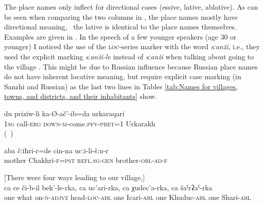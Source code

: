 The place names only inflect for directional cases (essive, lative, ablative). As can be seen when comparing the two columns in , the place names mostly have directional meaning, \tie\ the lative is identical to the place names themselves. Examples are given in . In the speech of a few younger speakers (age 30 or younger) I noticed the use of the  \textsc{loc}-series marker with the word \textit{sːanži}, i.e., they used the explicit marking \textit{sːanži-le} instead of \textit{sːanži} when talking about going to the village . This might be due to Russian influence because Russian place names do not have inherent locative meaning, but require explicit case marking (in Sanzhi and Russian) as the last two lines in Tables \ref{tab:Names for villages, towns, and districts, and their inhabitants} show.

%
\begin{exe}
	\ex	\label{ex:I came to Urkarakh by call}
	\gll   	du	priziw-li	ka-Ø-ač'-ib=da	urkaraqari\\
		\textsc{1sg}	call-\textsc{erg}	\textsc{down-m}-come.\textsc{pfv-pret}=1	Urkarakh\\
	\glt 	 {} (\tie\ )

	\ex	\label{ex:My mother was in Chakhri, at her brother's place}
	\gll  	aba	čːiħri-r=de	cin-na	ucːi-li-šːu-r\\
		mother	Chakhri-\textsc{f=pst}		\textsc{refl.sg-gen}	brother-\textsc{obl-ad-f}\\
	\glt	{}

	\ex	\label{ex:one through the peak on which there is}[There were four ways leading to our village,]\\
	\gll  	ca	ce	či-b-il	bek'-le-rka,	ca	uc'ari-rka,	ca	χudec'a-rka,		ca	šaˁrʡaˁ-rka\\
		one	what	on-\textsc{n-adjvz}	head-\textsc{loc-abl}	one	Icari-\textsc{abl}	one	Khuduc-\textsc{abl}	one	Shari-\textsc{abl}\\
	\glt  	{}
\end{exe}

